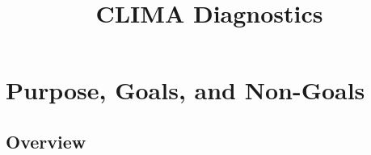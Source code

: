 \documentclass{report}
\title{CLIMA Diagnostics}
\author{ }
\begin{document}
\maketitle
\tableofcontents

\chapter{Purpose, Goals, and Non-Goals}

\section{Overview}



\end{document}

